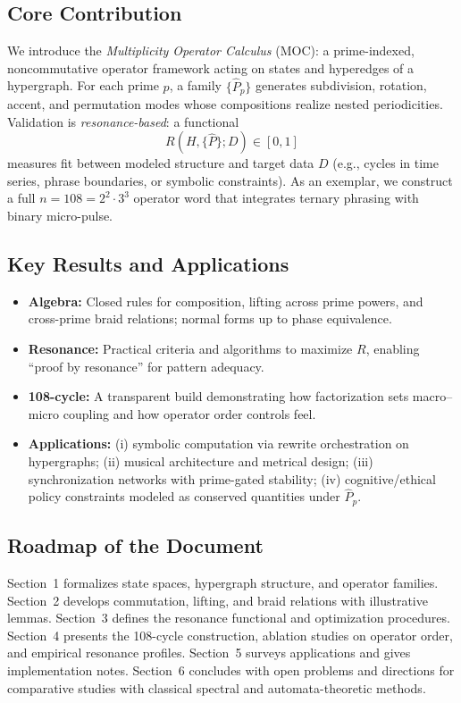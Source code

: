 \documentclass[12pt]{article}
\numberwithin{equation}{section}
\theoremstyle{plain}
\theoremstyle{definition}
\theoremstyle{remark}
\begin{document}
\subsection*{Core Contribution}
We introduce the \emph{Multiplicity Operator Calculus} (MOC): a prime-indexed, noncommutative operator framework acting on states and hyperedges of a hypergraph. For each prime \(p\), a family \(\{\hat{P}_{p}\}\) generates subdivision, rotation, accent, and permutation modes whose compositions realize nested periodicities. Validation is \emph{resonance-based}: a functional
\[
R(H,\{\hat{P}\};D)\in[0,1]
\]
measures fit between modeled structure and target data \(D\) (e.g., cycles in time series, phrase boundaries, or symbolic constraints). As an exemplar, we construct a full \(n=108=2^{2}\cdot 3^{3}\) operator word that integrates ternary phrasing with binary micro-pulse.

\subsection*{Key Results and Applications}
\begin{itemize}
  \item \textbf{Algebra:} Closed rules for composition, lifting across prime powers, and cross-prime braid relations; normal forms up to phase equivalence.
  \item \textbf{Resonance:} Practical criteria and algorithms to maximize \(R\), enabling “proof by resonance” for pattern adequacy.
  \item \textbf{108-cycle:} A transparent build demonstrating how factorization sets macro–micro coupling and how operator order controls feel.
  \item \textbf{Applications:} 
    (i) symbolic computation via rewrite orchestration on hypergraphs; 
    (ii) musical architecture and metrical design; 
    (iii) synchronization networks with prime-gated stability; 
    (iv) cognitive/ethical policy constraints modeled as conserved quantities under \(\hat{P}_{p}\).
\end{itemize}

\subsection*{Roadmap of the Document}
Section~1 formalizes state spaces, hypergraph structure, and operator families. Section~2 develops commutation, lifting, and braid relations with illustrative lemmas. Section~3 defines the resonance functional and optimization procedures. Section~4 presents the 108-cycle construction, ablation studies on operator order, and empirical resonance profiles. Section~5 surveys applications and gives implementation notes. Section~6 concludes with open problems and directions for comparative studies with classical spectral and automata-theoretic methods.
\end{document}
